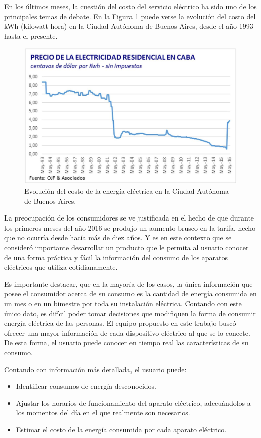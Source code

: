 En los últimos meses, la cuestión del costo del servicio eléctrico ha sido uno de los principales temas de debate. En la Figura \ref{fig:costo_caba} puede verse la evolución del costo del kWh (kilowatt hora) en la Ciudad Autónoma de Buenos Aires, desde el año 1993 hasta el presente.

\begin{figure}[h]
	\centering
	\includegraphics[width=12cm]{./Figures/1_1_costo_electricidad_caba.png}
	\caption{Evolución del costo de la energía eléctrica en la Ciudad Autónoma de Buenos Aires.}
	\label{fig:costo_caba}
\end{figure}

La preocupación de los consumidores se ve justificada en el hecho de que durante los primeros meses del año 2016 se produjo un aumento brusco en la tarifa, hecho que no ocurría desde hacía más de diez años. Y es en este contexto que se consideró importante desarrollar un producto que le permita al usuario conocer de una forma práctica y fácil la información del consumo de los aparatos eléctricos que utiliza cotidianamente. 

Es importante destacar, que en la mayoría de los casos, la única información que posee el consumidor acerca de su consumo es la cantidad de energía consumida en un mes o en un bimestre por toda su instalación eléctrica. Contando con este único dato, es difícil poder tomar decisiones que modifiquen la forma de consumir energía eléctrica de las personas. El equipo propuesto en este trabajo buscó ofrecer una mayor información de cada dispositivo eléctrico al que se lo conecte. De esta forma, el usuario puede conocer en tiempo real las características de su consumo.

Contando con información más detallada, el usuario puede:
\begin{itemize}
\item Identificar consumos de energía desconocidos.
\item Ajustar los horarios de funcionamiento del aparato eléctrico, adecuándolos a los momentos del día en el que realmente son necesarios.
\item Estimar el costo de la energía consumida por cada aparato eléctrico.
\end{itemize}

